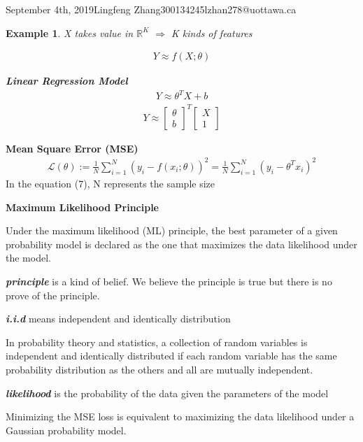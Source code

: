 \documentclass{article}
\newtheorem{ex}{Example}
\begin{document}
\begin{lecture}{September 4th, 2019}{Lingfeng Zhang}{300134245}{lzhan278@uottawa.ca}
\begin{ex}
X takes value in $\mathbb{R}^K$ $\Rightarrow$ K kinds of features

\begin{eqnarray}
Y \approx f(X;\theta)
\end{eqnarray}

\textbf{Linear Regression Model}
\begin{eqnarray}
Y \approx \theta ^TX +b
\end{eqnarray}
\begin{eqnarray}
Y \approx \left[ {\begin{array}{c}
   \theta \\
   b
  \end{array} } \right]^T\left[ {\begin{array}{c}
   X \\
   1
  \end{array} } \right]
\end{eqnarray}
\end{ex}

\textbf{Mean Square Error (MSE)}
\begin{eqnarray}
\mathcal{L}(\theta):=\frac{1}{N}\sum_{i=1}^{N}(y_i-f(x_i;\theta))^2=\frac{1}{N}\sum_{i=1}^{N}(y_i-\theta ^Tx_i)^2
\end{eqnarray}
In the equation (7), N represents the sample size

\textbf{Maximum Likelihood Principle}

Under the maximum likelihood (ML) principle, the best parameter of a given probability model is declared as the one that maximizes the data likelihood under the model.

\textbf{\emph{principle} }is a kind of belief. We believe the principle is true but there is no prove of the principle. 

\textbf{\emph{i.i.d}} means independent and identically distribution

In probability theory and statistics, a collection of random variables is independent and identically distributed if each random variable has the same probability distribution as the others and all are mutually independent.\cite{iid11}

\textbf{\emph{likelihood}}  is the probability of the data given the parameters of the model


Minimizing the MSE loss is equivalent to maximizing the data likelihood under a Gaussian probability model.


\end{lecture}
\end{document}

